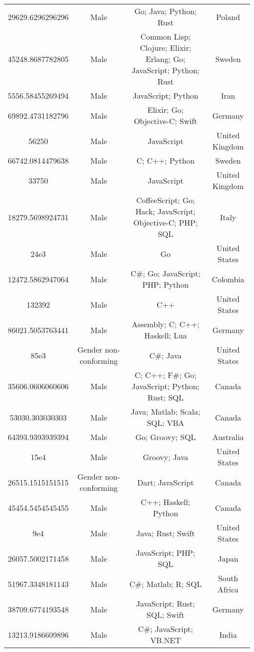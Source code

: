 \begin{center}
\begin{tabular}{ |c|c|c|c| }
29629.6296296296  &  Male  &  Go; Java; Python; Rust  &  Poland  \\ 
45248.8687782805  &  Male  &  Common Lisp; Clojure; Elixir; Erlang; Go; JavaScript; Python; Rust  &  Sweden  \\ 
5556.58455269494  &  Male  &  JavaScript; Python  &  Iran  \\ 
69892.4731182796  &  Male  &  Elixir; Go; Objective-C; Swift  &  Germany  \\ 
56250  &  Male  &  JavaScript  &  United Kingdom  \\ 
66742.0814479638  &  Male  &  C; C++; Python  &  Sweden  \\ 
33750  &  Male  &  JavaScript  &  United Kingdom  \\ 
18279.5698924731  &  Male  &  CoffeeScript; Go; Hack; JavaScript; Objective-C; PHP; SQL  &  Italy  \\ 
24e3  &  Male  &  Go  &  United States  \\ 
12472.5862947064  &  Male  &  C\#; Go; JavaScript; PHP; Python  &  Colombia  \\ 
132392  &  Male  &  C++  &  United States  \\ 
86021.5053763441  &  Male  &  Assembly; C; C++; Haskell; Lua  &  Germany  \\ 
85e3  &  Gender non-conforming  &  C\#; Java  &  United States  \\ 
35606.0606060606  &  Male  &  C; C++; F\#; Go; JavaScript; Python; Rust; SQL  &  Canada  \\ 
53030.303030303  &  Male  &  Java; Matlab; Scala; SQL; VBA  &  Canada  \\ 
64393.9393939394  &  Male  &  Go; Groovy; SQL  &  Australia  \\ 
15e4  &  Male  &  Groovy; Java  &  United States  \\ 
26515.1515151515  &  Gender non-conforming  &  Dart; JavaScript  &  Canada  \\ 
45454.5454545455  &  Male  &  C++; Haskell; Python  &  Canada  \\ 
9e4  &  Male  &  Java; Rust; Swift  &  United States  \\ 
26057.5002171458  &  Male  &  JavaScript; PHP; SQL  &  Japan  \\ 
51967.3348181143  &  Male  &  C\#; Matlab; R; SQL  &  South Africa  \\ 
38709.6774193548  &  Male  &  JavaScript; Rust; SQL; Swift  &  Germany  \\ 
13213.9186609896  &  Male  &  C\#; JavaScript; VB.NET  &  India  \\ 

\end{tabular}
\end{center}
